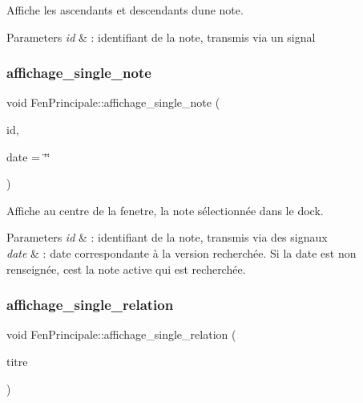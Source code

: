 Affiche les ascendants et descendants d\textquotesingle{}une note. 


\begin{DoxyParams}{Parameters}
{\em id} & \+: identifiant de la note, transmis via un signal \\
\hline
\end{DoxyParams}
\mbox{\label{class_fen_principale_a6cc4b79a54ed443cced0fb03f7f83619}} 
\subsubsection{\texorpdfstring{affichage\+\_\+single\+\_\+note}{affichage\_single\_note}}
{\footnotesize\ttfamily void Fen\+Principale\+::affichage\+\_\+single\+\_\+note (\begin{DoxyParamCaption}\item[{Q\+String}]{id,  }\item[{Q\+String}]{date = {\ttfamily \char`\"{}\char`\"{}} }\end{DoxyParamCaption})\hspace{0.3cm}{\ttfamily [slot]}}



Affiche au centre de la fenetre, la note sélectionnée dans le dock. 


\begin{DoxyParams}{Parameters}
{\em id} & \+: identifiant de la note, transmis via des signaux \\
\hline
{\em date} & \+: date correspondante à la version recherchée. Si la date est non renseignée, c\textquotesingle{}est la note active qui est recherchée. \\
\hline
\end{DoxyParams}
\mbox{\label{class_fen_principale_a67e142066003277638ed8b7dc67b19e9}} 
\subsubsection{\texorpdfstring{affichage\+\_\+single\+\_\+relation}{affichage\_single\_relation}}
{\footnotesize\ttfamily void Fen\+Principale\+::affichage\+\_\+single\+\_\+relation (\begin{DoxyParamCaption}\item[{Q\+String}]{titre }\end{DoxyParamCaption})\hspace{0.3cm}{\ttfamily [slot]}}



